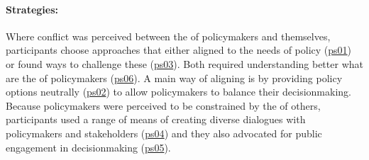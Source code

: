\paragraph{Strategies:}
Where conflict was perceived between the \skipers{} of policymakers and themselves, participants choose approaches that either aligned to the needs of policy (\hyperref[tab:resskipersstrat]{ps01}) or found ways to challenge these \skipers{} (\hyperref[tab:resskipersstrat]{ps03}). Both required understanding better what are the \skipers{} of policymakers (\hyperref[tab:resskipersstrat]{ps06}). A main way of aligning is by providing policy options neutrally (\hyperref[tab:resskipersstrat]{ps02}) to allow policymakers to balance their decisionmaking. Because policymakers \skipers{} were perceived to be constrained by the \skipers{} of others, participants used a range of means of creating diverse dialogues with policymakers and stakeholders (\hyperref[tab:resskipersstrat]{ps04}) and they also advocated for public engagement in decisionmaking (\hyperref[tab:resskipersstrat]{ps05}).

\subsection{\titopin}\label{sec:resskiopin}

